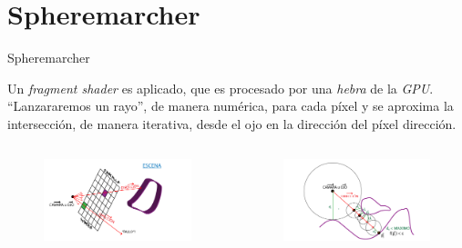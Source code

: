 \section{Spheremarcher}
\SectionPage


\begin{frame}{Spheremarcher}

    Un \textit{fragment shader} es aplicado, que es procesado por una \textit{hebra} de la \textit{GPU}. \enquote{Lanzararemos un rayo}, de manera numérica, para cada píxel y se aproxima la intersección, de manera iterativa, desde el ojo en la dirección del píxel dirección.
    
    \vfill

    \begin{columns}[onlytextwidth]
        \begin{column}{0.50\textwidth}
            \begin{figure}[H]
              \centering
              \includegraphics[width=1.0\textwidth]{imagenes/gpu.png}
            \end{figure}
        \end{column}
        
        \begin{column}{0.50\textwidth}
            \begin{figure}[H]
              \centering
              \includegraphics[width=1.0\textwidth]{imagenes/spheremarching.png}
            \end{figure}
        \end{column}
        

\end{columns}
\end{frame}

